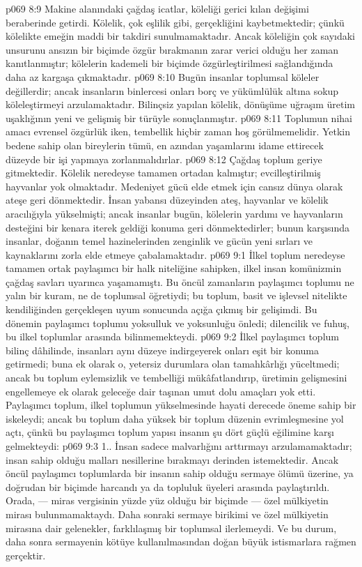 \vs p069 8:9 Makine alanındaki çağdaş icatlar, köleliği gerici kılan değişimi beraberinde getirdi. Kölelik, çok eşlilik gibi, gerçekliğini kaybetmektedir; çünkü kölelikte emeğin maddi bir takdiri sunulmamaktadır. Ancak köleliğin çok sayıdaki unsurunu ansızın bir biçimde özgür bırakmanın zarar verici olduğu her zaman kanıtlanmıştır; kölelerin kademeli bir biçimde özgürleştirilmesi sağlandığında daha az kargaşa çıkmaktadır.
\vs p069 8:10 Bugün insanlar toplumsal köleler değillerdir; ancak insanların binlercesi onları borç ve yükümlülük altına sokup köleleştirmeyi arzulamaktadır. Bilinçsiz yapılan kölelik, dönüşüme uğraşım üretim uşaklığının yeni ve gelişmiş bir türüyle sonuçlanmıştır.
\vs p069 8:11 Toplumun nihai amacı evrensel özgürlük iken, tembellik hiçbir zaman hoş görülmemelidir. Yetkin bedene sahip olan bireylerin tümü, en azından yaşamlarını idame ettirecek düzeyde bir işi yapmaya zorlanmalıdırlar.
\vs p069 8:12 Çağdaş toplum geriye gitmektedir. Kölelik neredeyse tamamen ortadan kalmıştır; evcilleştirilmiş hayvanlar yok olmaktadır. Medeniyet gücü elde etmek için cansız dünya olarak ateşe geri dönmektedir. İnsan yabansı düzeyinden ateş, hayvanlar ve kölelik aracılığıyla yükselmişti; ancak insanlar bugün, kölelerin yardımı ve hayvanların desteğini bir kenara iterek geldiği konuma geri dönmektedirler; bunun karşısında insanlar, doğanın temel hazinelerinden zenginlik ve gücün yeni sırları ve kaynaklarını zorla elde etmeye çabalamaktadır.
\vs p069 9:1 İlkel toplum neredeyse tamamen ortak paylaşımcı bir halk niteliğine sahipken, ilkel insan komünizmin çağdaş savları uyarınca yaşamamıştı. Bu öncül zamanların paylaşımcı toplumu ne yalın bir kuram, ne de toplumsal öğretiydi; bu toplum, basit ve işlevsel nitelikte kendiliğinden gerçekleşen uyum sonucunda açığa çıkmış bir gelişimdi. Bu dönemin paylaşımcı toplumu yoksulluk ve yoksunluğu önledi; dilencilik ve fuhuş, bu ilkel toplumlar arasında bilinmemekteydi.
\vs p069 9:2 İlkel paylaşımcı toplum bilinç dâhilinde, insanları aynı düzeye indirgeyerek onları eşit bir konuma getirmedi; buna ek olarak o, yetersiz durumlara olan tamahkârlığı yüceltmedi; ancak bu toplum eylemsizlik ve tembelliği mükâfatlandırıp, üretimin gelişmesini engellemeye ek olarak geleceğe dair taşınan umut dolu amaçları yok etti. Paylaşımcı toplum, ilkel toplumun yükselmesinde hayati derecede öneme sahip bir iskeleydi; ancak bu toplum daha yüksek bir toplum düzenin evrimleşmesine yol açtı, çünkü bu paylaşımcı toplum yapısı insanın şu dört güçlü eğilimine karşı gelmekteydi:
\vs p069 9:3 1.\bibnobreakspace {}. İnsan sadece malvarlığını arttırmayı arzulamamaktadır; insan sahip olduğu malları nesillerine bırakmayı derinden istemektedir. Ancak öncül paylaşımcı toplumlarda bir insanın sahip olduğu sermaye ölümü üzerine, ya doğrudan bir biçimde harcandı ya da topluluk üyeleri arasında paylaştırıldı. Orada, --- miras vergisinin yüzde yüz olduğu bir biçimde --- özel mülkiyetin mirası bulunmamaktaydı. Daha sonraki sermaye birikimi ve özel mülkiyetin mirasına dair gelenekler, farklılaşmış bir toplumsal ilerlemeydi. Ve bu durum, daha sonra sermayenin kötüye kullanılmasından doğan büyük istismarlara rağmen gerçektir.
